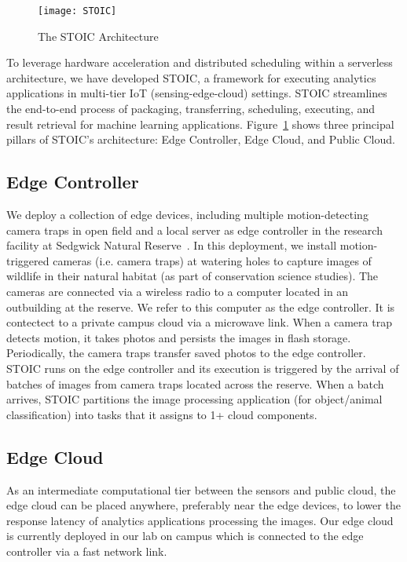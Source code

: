 \begin{figure}
    \centering
    \texttt{[image: STOIC]}
    \caption{The STOIC Architecture \label{fig:STOIC}}
\end{figure}

To leverage hardware acceleration and distributed scheduling within a serverless architecture, we have developed STOIC, a framework for executing analytics applications in multi-tier IoT (sensing-edge-cloud) settings. STOIC streamlines the end-to-end process of packaging, transferring, scheduling, executing, and result retrieval for machine learning applications. Figure~\ref{fig:STOIC} shows three principal pillars of STOIC's architecture: Edge Controller, Edge Cloud, and Public Cloud.

\subsection{Edge Controller}
 We deploy a collection of edge devices, including multiple motion-detecting camera traps in open field and a local server as edge controller in the research facility at Sedgwick Natural Reserve~\cite{ref:sedgwick}. 
In this deployment, we install motion-triggered cameras (i.e. camera traps) at 
watering holes to capture images of wildlife in their natural habitat (as part of conservation science studies). The cameras are connected via a wireless radio to a computer located in an outbuilding at the reserve. We refer to this computer as the edge controller.  It is contectect to a private campus cloud via a microwave link. When a camera trap detects motion, it takes photos and persists the images in flash storage. Periodically, the camera traps transfer saved photos to the edge controller. STOIC runs on the edge controller and its execution is triggered by the arrival of batches of images from camera traps located across the reserve. When a batch arrives, STOIC partitions the image processing application (for object/animal classification) into tasks that it assigns to 1+ cloud components.
 
 \subsection{Edge Cloud}
 
As an intermediate computational tier between the sensors and public cloud, the edge cloud can be placed anywhere, preferably near the edge devices, to lower the response latency of analytics applications processing the images. Our edge cloud is currently deployed in our lab on campus which is connected to the edge controller via a fast network link.

